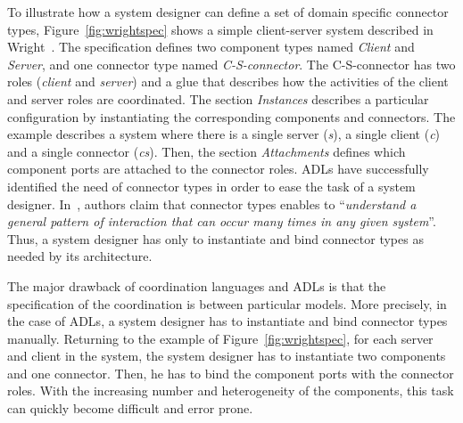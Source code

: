 To illustrate how a system designer can define a set of domain specific connector types, Figure~\ref{fig:wrightspec} shows a simple client-server system described in Wright~\cite{wrightbib}. The specification defines two component types named \emph{Client} and \emph{Server}, and one connector type named \emph{C-S-connector}. The C-S-connector has two roles (\emph{client} and \emph{server}) and a glue that describes how the activities of the client and server roles are coordinated. The section \emph{Instances} describes a particular configuration by instantiating the corresponding components and connectors. The example describes a system where there is a single server (\emph{s}), a single client (\emph{c}) and a single connector (\emph{cs}). Then, the section \emph{Attachments} defines which component ports are attached to the connector roles. ADLs have successfully identified the need of connector types in order to ease the task of a system designer. In~\cite{wrightbib}, authors claim that connector types enables to ``\emph{understand a general pattern of interaction that can occur many times in any given system}''. Thus, a system designer has only to instantiate and bind connector types as needed by its architecture. 

The major drawback of coordination languages and ADLs is that the specification of the coordination is between particular models. More precisely, in the case of ADLs, a system designer has to instantiate and bind connector types manually. Returning to the example of Figure~\ref{fig:wrightspec}, for each server and client in the system, the system designer has to instantiate two components and one connector. Then, he has to bind the component ports with the connector roles. With the increasing number and heterogeneity of the components, this task can quickly become difficult and error prone.

